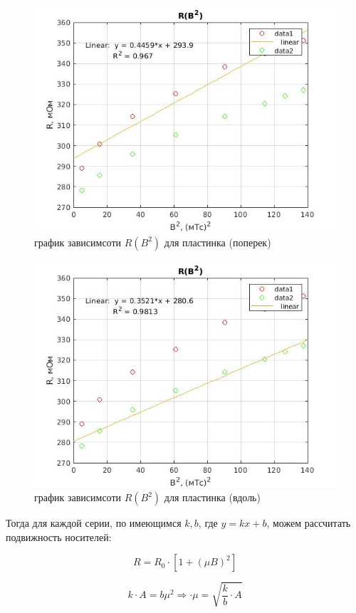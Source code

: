 \documentclass[a4paper, 12pt]{article}%
\begin{document}
\begin{center}
\begin{figure}[!h]
    \centering
    \includegraphics[width = 10 cm]{graph2(no_disk_poperek).jpg}
    \caption{график зависимсоти $R(B^2)$ для пластинка (поперек)}
    \label{ser2}
\end{figure}
\end{center}


\begin{center}
\begin{figure}[!h]
    \centering
    \includegraphics[width = 10 cm]{graph2(no_disk_vdol).jpg}
    \caption{график зависимсоти $R(B^2)$ для пластинка (вдоль)}
    \label{ser3}
\end{figure}
\end{center}

Тогда для каждой серии, по имеющимся $k,b$, где $y = kx + b$, можем рассчитать подвижность носителей:

\[ R = R_0\cdot\left[1 + (\mu B)^2\right]\]

\[ k \cdot A = b\mu^2 \Rightarrow \cdot \mu = \sqrt{\frac{k}{b} \cdot A} \]
\end{document}

